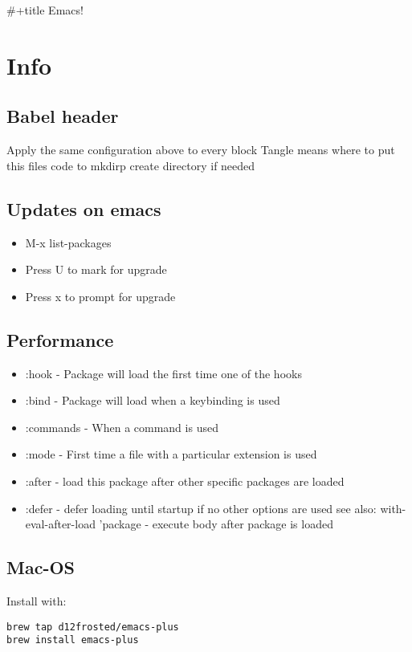 \documentclass[11pt]{article}
\author{pol}
\date{\today}
\title{}
\begin{document}
\tableofcontents

\#+title Emacs!

\section{Info}
\label{sec:orgfbc6ad0}
\subsection{Babel header}
\label{sec:orga085b2a}
Apply the same configuration above to every block
Tangle means where to put this files code to
mkdirp create directory if needed
\subsection{Updates on emacs}
\label{sec:org852232c}
\begin{itemize}
\item M-x list-packages
\item Press U to mark for upgrade
\item Press x to prompt for upgrade
\end{itemize}

\subsection{Performance}
\label{sec:org4332028}
\begin{itemize}
\item :hook - Package will load the first time one of the hooks
\item :bind - Package will load when a keybinding is used
\item :commands - When a command is used
\item :mode - First time a file with a particular extension is used
\item :after - load this package after other specific packages are loaded
\item :defer - defer loading until startup if no other options are used
see also:
with-eval-after-load 'package - execute body after package is loaded
\end{itemize}
\subsection{Mac-OS}
\label{sec:org30fc153}
Install with:
\begin{verbatim}
brew tap d12frosted/emacs-plus
brew install emacs-plus
\end{verbatim}
\end{document}
